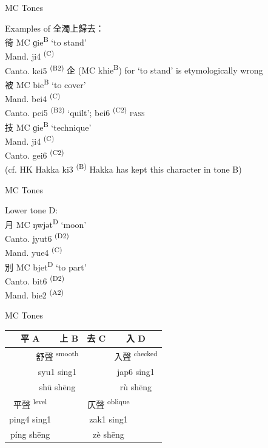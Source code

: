 \documentclass{beamer}
\begin{document}
\begin{frame}[fragile]{MC Tones}

Examples of 全濁上歸去：\\
\bigskip
徛 MC ɡie\textsuperscript{B} \enquote*{to stand}\\
Mand. ji4 \textsuperscript{(C)}\\
Canto. kei5 \textsuperscript{(B2)} {\scriptsize 企 (MC khie\textsuperscript{B}) for \enquote*{to stand} is etymologically wrong}\\
\medskip
被 MC bie\textsuperscript{B} \enquote*{to cover}\\
Mand. bei4 \textsuperscript{(C)}\\
Canto. pei5 \textsuperscript{(B2)} \enquote*{quilt}; bei6 \textsuperscript{(C2)} \textsc{pass}\\
\medskip
技 MC ɡie\textsuperscript{B} \enquote*{technique}\\
Mand. ji4 \textsuperscript{(C)}\\
Canto. gei6 \textsuperscript{(C2)}\\
(cf. HK Hakka ki3 \textsuperscript{(B)} {\scriptsize Hakka has kept this character in tone B})\\

\end{frame}

\begin{frame}[fragile]{MC Tones}

Lower tone D:\\
\bigskip
月 MC ŋwjət\textsuperscript{D} \enquote*{moon}\\
Canto. jyut6 \textsuperscript{(D2)}\\
Mand. yue4 \textsuperscript{(C)}\\
\medskip
別 MC bjet\textsuperscript{D} \enquote*{to part}\\
Canto. bit6 \textsuperscript{(D2)}\\
Mand. bie2 \textsuperscript{(A2)}\\

\end{frame}

\begin{frame}[fragile]{MC Tones}

\begin{table}
\begin{tabular}{c | c | c | c}     
        平 A & 上 B & 去 C & 入 D\\ \hline
        \multicolumn{3}{c|}{舒聲 \textsuperscript{smooth}} & 入聲 \textsuperscript{checked}\\
        \multicolumn{3}{c|}{syu1 sing1} & jap6 sing1\\
        \multicolumn{3}{c|}{shū shēng} & rù shēng\\ \hline
        平聲 \textsuperscript{level} & \multicolumn{3}{c}{仄聲 \textsuperscript{oblique}}\\
        ping4 sing1 & \multicolumn{3}{c}{zak1 sing1}\\
        píng shēng & \multicolumn{3}{c}{zè shēng}\\ \hline
\end{tabular}
\end{table}

\end{frame}
\end{document}
